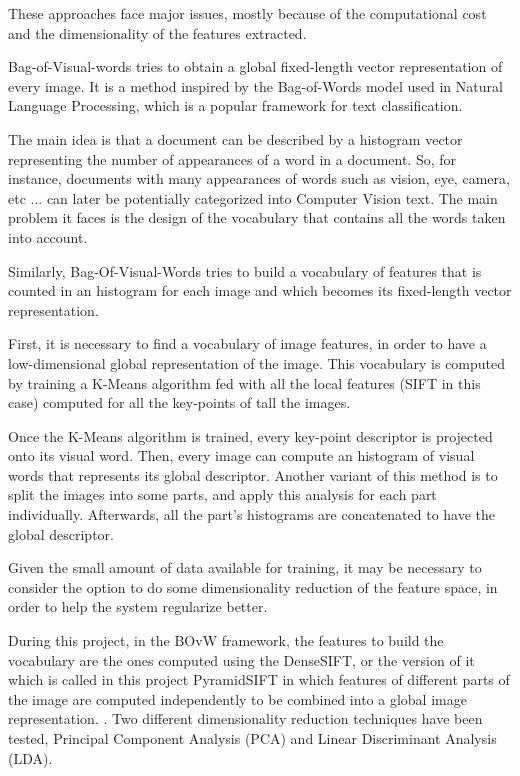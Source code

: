 \documentclass[runningheads]{llncs}
\begin{document}
These approaches face major issues, mostly because of the computational cost and the dimensionality of the features extracted.

Bag-of-Visual-words tries to obtain a global fixed-length vector representation of every image. It is a method inspired by the Bag-of-Words model used in Natural Language Processing, which is a popular framework for text classification.

The main idea is that a document can be described by a histogram vector representing the number of appearances of a word in a document. So, for instance, documents with many appearances of words such as vision, eye, camera, etc ... can later be potentially categorized into Computer Vision text. The main problem it faces is the design of the vocabulary that contains all the words taken into account.

Similarly, Bag-Of-Visual-Words tries to build a vocabulary of features that is counted in an histogram for each image and which becomes its fixed-length vector representation.

First, it is necessary to find a vocabulary of image features, in order to have a low-dimensional global representation of the image. This vocabulary is computed by training a K-Means algorithm fed with all the local features (SIFT in this case) computed for all the key-points of tall the images.

Once the K-Means algorithm is trained, every key-point descriptor is projected onto its visual word. Then, every image can compute an histogram of visual words that represents its global descriptor.
Another variant of this method is to split the images into some parts, and apply this analysis for each part individually. Afterwards, all the part's histograms are concatenated to have the global descriptor.


Given the small amount of data available for training, it may be necessary to consider the option to do some dimensionality reduction of the feature space, in order to help the system regularize better.

During this project, in the BOvW framework, the features to build the vocabulary are the ones computed using the DenseSIFT, or the version of it which is called in this project PyramidSIFT in which features of different parts of the image are computed independently to be combined into a global image representation. . Two different dimensionality reduction techniques have been tested, Principal Component Analysis (PCA) and Linear Discriminant Analysis (LDA).
\end{document}
